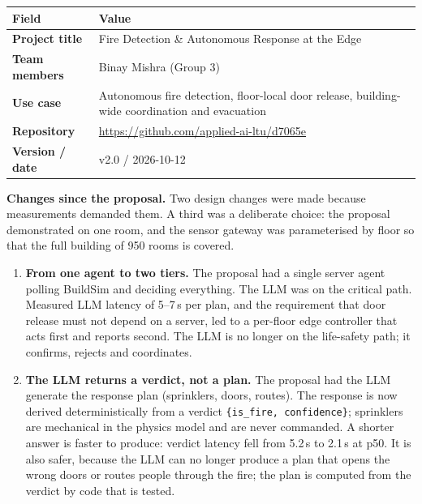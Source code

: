 \documentclass[11pt]{article}
\providecommand{\tightlist}{\setlength{\itemsep}{0pt}\setlength{\parskip}{0pt}}
\begin{document}
\begin{longtable}[]{@{}
  >{\raggedright\arraybackslash}p{}
  >{\raggedright\arraybackslash}p{}@{}}
\toprule
\textbf{Field} & \textbf{Value} \\
\midrule
\endhead
\textbf{Project title} & Fire Detection \& Autonomous Response at the Edge \\
\textbf{Team members} & Binay Mishra (Group 3) \\
\textbf{Use case} & Autonomous fire detection, floor-local door release, building-wide coordination and evacuation \\
\textbf{Repository} & \url{https://github.com/applied-ai-ltu/d7065e} \\
\textbf{Version / date} & v2.0 / 2026-10-12 \\
\bottomrule
\end{longtable}

\textbf{Changes since the proposal.} Two design changes were made because measurements demanded them. 
A third was a deliberate choice: the proposal demonstrated on one room, and the sensor gateway 
was parameterised by floor so that the full building of 950 rooms is covered.
\begin{enumerate}\tightlist
  \item \textbf{From one agent to two tiers.} The proposal had a single server agent polling BuildSim 
  and deciding everything. The LLM was on the critical path. Measured LLM latency of 5--7\,s per plan, 
  and the requirement that door release must not depend on a server, led to a per-floor edge controller 
  that acts first and reports second. The LLM is no longer on the life-safety path; 
  it confirms, rejects and coordinates.
  \item \textbf{The LLM returns a verdict, not a plan.} The proposal had the LLM generate the response 
  plan (sprinklers, doors, routes). The response is now derived deterministically from a verdict 
  \texttt{\{is\_fire, confidence\}}; sprinklers are mechanical in the physics model and are never commanded. 
  A shorter answer is faster to produce: verdict latency fell from 5.2\,s to 2.1\,s at p50. It is also 
  safer, because the LLM can no longer produce a plan that opens the wrong doors or routes people 
  through the fire; the plan is computed from the verdict by code that is tested.
\end{enumerate}


\end{document}
